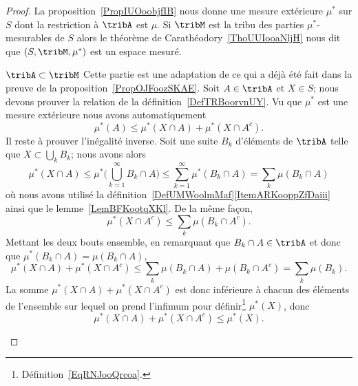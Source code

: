 \begin{proof}
    La proposition~\ref{PropIUOoobjfIB} nous donne une mesure extérieure \( \mu^*\) sur \( S\) dont la restriction à \( \tribA\) est \( \mu\). Si \( \tribM\) est la tribu des parties \( \mu^*\)-mesurables de \( S\) alors le théorème de Carathéodory~\ref{ThoUUIooaNljH} nous dit que \( (S,\tribM,\mu^*)\) est un espace mesuré.
    \begin{subproof}
        \item[\( \tribA\subset\tribM\)]
            Cette partie est une adaptation de ce qui a déjà été fait dans la preuve de la proposition~\ref{PropOJFoozSKAE}. Soit \( A\in\tribA\) et \( X\in S\); nous devons prouver la relation de la définition~\ref{DefTRBoorvnUY}. Vu que \( \mu^*\) est une mesure extérieure nous avons automatiquement
            \begin{equation}
                \mu^*(A)\leq \mu^*(X\cap A)+\mu^*(X\cap A^c).
            \end{equation}
            Il reste à prouver l'inégalité inverse. Soit une suite \( B_k\) d'éléments de \( \tribA\) telle que \( X\subset\bigcup_kB_k\); nous avons alors
            \begin{equation}
                \mu^*(X\cap A)\leq \mu^*\big( \bigcup_{k=1}^{\infty}B_k\cap A \big)\leq \sum_{k=1}^{\infty}\mu^*(B_k\cap A)=\sum_k\mu(B_k\cap A)
            \end{equation}
            où nous avons utilisé la définition~\ref{DefUMWoolmMaf}\ref{ItemARKooppZfDaiii} ainsi que le lemme~\ref{LemBFKootqXKl}. De la même façon,
            \begin{equation}
                \mu^*(X\cap A^c)\leq \sum_k\mu(B_k\cap A^c).
            \end{equation}
            Mettant les deux bouts ensemble, en remarquant que \( B_k\cap A\in\tribA\) et donc que \( \mu^*(B_k\cap A)=\mu(B_k\cap A)\),
            \begin{equation}
                \mu^*(X\cap A)+\mu^*(X\cap A^c)\leq \sum_k\mu(B_k\cap A)+\mu(B_k\cap A^c)=\sum_k\mu(B_k).
            \end{equation}
            La somme \( \mu^*(X\cap A)+\mu^*(X\cap A^c)\) est donc inférieure à chacun des éléments de l'ensemble sur lequel on prend l'infimum pour définir\footnote{Définition~\ref{EqRNJooQrcoa}.} \( \mu^*(X)\), donc
            \begin{equation}
                 \mu^*(X\cap A)+\mu^*(X\cap A^c)\leq \mu^*(X).
            \end{equation}
    \end{subproof}


\end{proof}
